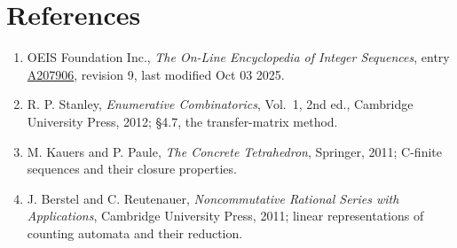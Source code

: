 \documentclass[11pt]{article}
\theoremstyle{definition}
\begin{document}
\section{References}

\begin{enumerate}

\item OEIS Foundation Inc., \emph{The On-Line Encyclopedia of Integer Sequences}, entry \href{https://oeis.org/A207906}{A207906}, revision 9, last modified Oct 03 2025.

\item R. P. Stanley, \emph{Enumerative Combinatorics}, Vol.~1, 2nd ed., Cambridge University Press, 2012; \S4.7, the transfer-matrix method.

\item M. Kauers and P. Paule, \emph{The Concrete Tetrahedron}, Springer, 2011; C-finite sequences and their closure properties.

\item J. Berstel and C. Reutenauer, \emph{Noncommutative Rational Series with Applications}, Cambridge University Press, 2011; linear representations of counting automata and their reduction.

\end{enumerate}
\end{document}
